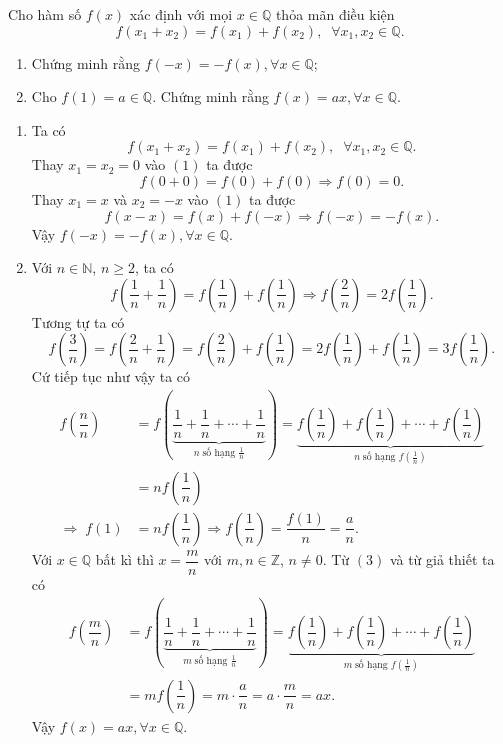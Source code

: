 \begin{vn}
Cho hàm số $f(x)$ xác định với mọi $x\in\mathbb{Q}$ thỏa mãn điều kiện
\[f(x_1+x_2)=f(x_1)+f(x_2),\;\;\forall x_1,x_2\in\mathbb{Q}.\]
\begin{enumerate}
	\item Chứng minh rằng $f(-x)=-f(x), \forall x\in\mathbb{Q}$;
	\item Cho $f(1)=a\in\mathbb{Q}$. Chứng minh rằng $f(x)=ax, \forall x\in\mathbb{Q}$.
\end{enumerate}
\loigiai
{
\begin{enumerate}
\item Ta có \[f(x_1+x_2)=f(x_1)+f(x_2),\;\;\forall x_1,x_2\in\mathbb{Q}.\tag{1}\]
Thay $x_1=x_2=0$ vào $(1)$ ta được 
\[f(0+0)=f(0)+f(0)\Rightarrow f(0)=0.\]
Thay $x_1=x$ và $x_2=-x$ vào $(1)$ ta được 
\[f(x-x)=f(x)+f(-x)\Rightarrow f(-x)=-f(x).\]
Vậy $f(-x)=-f(x), \forall x\in\mathbb{Q}$.
\item Với $n\in\mathbb{N}$, $n\ge 2$, ta có
\[f\left(\dfrac{1}{n}+\dfrac{1}{n}\right)=f\left(\dfrac{1}{n}\right)+f\left(\dfrac{1}{n}\right)\Rightarrow f\left(\dfrac{2}{n}\right)=2f\left(\dfrac{1}{n}\right).\]
Tương tự ta có
\[f\left(\dfrac{3}{n}\right)=f\left(\dfrac{2}{n}+\dfrac{1}{n}\right)=f\left(\dfrac{2}{n}\right)+f\left(\dfrac{1}{n}\right)=2f\left(\dfrac{1}{n}\right)+f\left(\dfrac{1}{n}\right)=3f\left(\dfrac{1}{n}\right).\]
Cứ tiếp tục như vậy ta có
\begin{align*}
f\left(\dfrac{n}{n}\right)&=f\left(\underbrace{\dfrac{1}{n}+\dfrac{1}{n}+\cdots+\dfrac{1}{n}}_{n\;\text{số hạng $\frac{1}{n}$}}\right)=\underbrace{f\left(\dfrac{1}{n}\right)+f\left(\dfrac{1}{n}\right)+\cdots+f\left(\dfrac{1}{n}\right)}_{n\;\text{số hạng $f\left(\frac{1}{n}\right)$}}\\ 
&=nf\left(\dfrac{1}{n}\right)\\
\Rightarrow\;f(1)&=nf\left(\dfrac{1}{n}\right)\Rightarrow f\left(\dfrac{1}{n}\right)=\dfrac{f(1)}{n}=\dfrac{a}{n}.\tag{3}
\end{align*}
Với $x\in\mathbb{Q}$ bất kì thì $x=\dfrac{m}{n}$ với $m,n\in\mathbb{Z}$, $n\ne 0$. Từ $(3)$ và từ giả thiết ta có
\begin{align*}
f\left(\dfrac{m}{n}\right)&=f\left(\underbrace{\dfrac{1}{n}+\dfrac{1}{n}+\cdots+\dfrac{1}{n}}_{m\;\text{số hạng $\frac{1}{n}$}}\right)=\underbrace{f\left(\dfrac{1}{n}\right)+f\left(\dfrac{1}{n}\right)+\cdots+f\left(\dfrac{1}{n}\right)}_{m\;\text{số hạng $f\left(\frac{1}{n}\right)$}}\\ 
&=mf\left(\dfrac{1}{n}\right)=m\cdot\dfrac{a}{n}=a\cdot \dfrac{m}{n}=ax.
\end{align*}
Vậy $f(x)=ax, \forall x\in\mathbb{Q}$.
\end{enumerate}
}
\end{vn}

